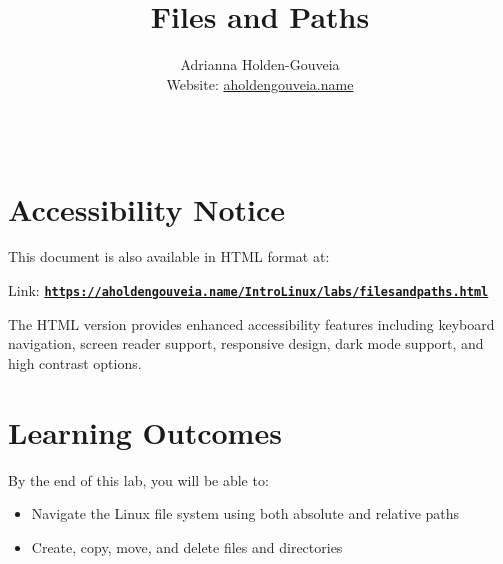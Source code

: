 \documentclass[12pt]{article}
\title{Files and Paths}
\author{
        Adrianna Holden-Gouveia \\
        Website: \href{https://aholdengouveia.name}{aholdengouveia.name}\\ 
        \date{\vspace{-5ex}}
        \faGithub {: aholdengouveia} \\
        }
\begin{document}
    

\maketitle

\section*{Accessibility Notice}
This document is also available in HTML format at:

Link: \href{https://aholdengouveia.name/IntroLinux/labs/filesandpaths.html}{\textbf{\nolinkurl{https://aholdengouveia.name/IntroLinux/labs/filesandpaths.html}}}

The HTML version provides enhanced accessibility features including keyboard navigation, screen reader support, responsive design, dark mode support, and high contrast options.



\section*{Learning Outcomes}
By the end of this lab, you will be able to:
\begin{itemize}
    \item Navigate the Linux file system using both absolute and relative paths
    \item Create, copy, move, and delete files and directories
\end{itemize}
\end{document}
